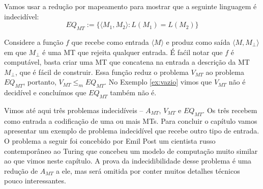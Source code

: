 \begin{example}
  Vamos usar a redução por mapeamento para mostrar que a seguinte linguagem é indecidível:
  \begin{displaymath}
    EQ_{MT} := \{\langle M_1, M_2 \rangle : L(M_1) = L(M_2)\}
  \end{displaymath}

  Considere a função $f$ que recebe como entrada $\langle M \rangle$ e produz como saída $\langle M, M_\bot\rangle$ em que $M_\bot$ é uma MT que rejeita qualquer entrada.
  É faćil notar que $f$ é computável, basta criar uma MT que concatena na entrada a descrição da MT $M_\bot$, que é fácil de construir.
  Essa função reduz o problema $V_{MT}$ ao problema $EQ_{MT}$, portanto, $V_{MT} \leq_m EQ_{MT}$.
  No Exemplo \ref{ex:vazio} vimos que $V_{MT}$ não é decidível e concluímos que $EQ_{MT}$ também não é.
\end{example}

Vimos até aqui três problemas indecidíveis -- $A_{MT}$, $V_{MT}$ e $EQ_{MT}$.
Os três recebem como entrada a codificação de uma ou mais MTs.
Para concluir o capítulo vamos apresentar um exemplo de problema indecidível que recebe outro tipo de entrada.
O problema a seguir foi concebido por Emil Post um cientista russo contemporâneo ao Turing que concebeu um modelo de computação muito similar ao que vimos neste capítulo.
A prova da indecidibilidade desse problema é uma redução de $A_{MT}$ a ele, mas será omitida por conter muitos detalhes técnicos pouco interessantes.

